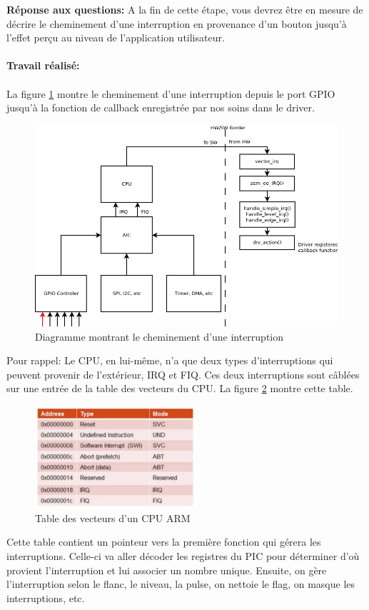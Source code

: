 \textbf{Réponse aux questions: }A la fin de cette étape, vous devrez être en mesure de décrire le cheminement d'une interruption
en provenance d'un bouton jusqu'à l'effet perçu au niveau de l’application utilisateur. \\\\
\textbf{Travail réalisé: }\\\\
La figure \ref{interrupt_path} montre le cheminement d'une interruption depuis le port GPIO jusqu'à la fonction de callback enregistrée par nos soins dans le driver.
\begin{figure}[H]
	\begin{center}
		\includegraphics[width=15cm]{img/interrupt_hw_path.png}
		\caption{Diagramme montrant le cheminement d'une interruption}
		\label{interrupt_path}
	\end{center}
\end{figure}
Pour rappel: Le CPU, en lui-même, n'a que deux types d'interruptions qui peuvent provenir de l'extérieur, IRQ et FIQ. Ces deux interruptions sont câblées sur une entrée de la table des vecteurs du CPU. La figure \ref{vector_table} montre cette table.
\begin{figure}[H]
	\begin{center}
		\includegraphics[width=6cm]{img/vector_table.png}
		\caption{Table des vecteurs d'un CPU ARM}
		\label{vector_table}
	\end{center}
\end{figure} 
Cette table contient un pointeur vers la première fonction qui gérera les interruptions. Celle-ci va aller décoder les registres du PIC pour déterminer d'où provient l'interruption et lui associer un nombre unique. Ensuite, on gère l'interruption selon le flanc, le niveau, la pulse, on nettoie le flag, on masque les interruptions, etc. \\

